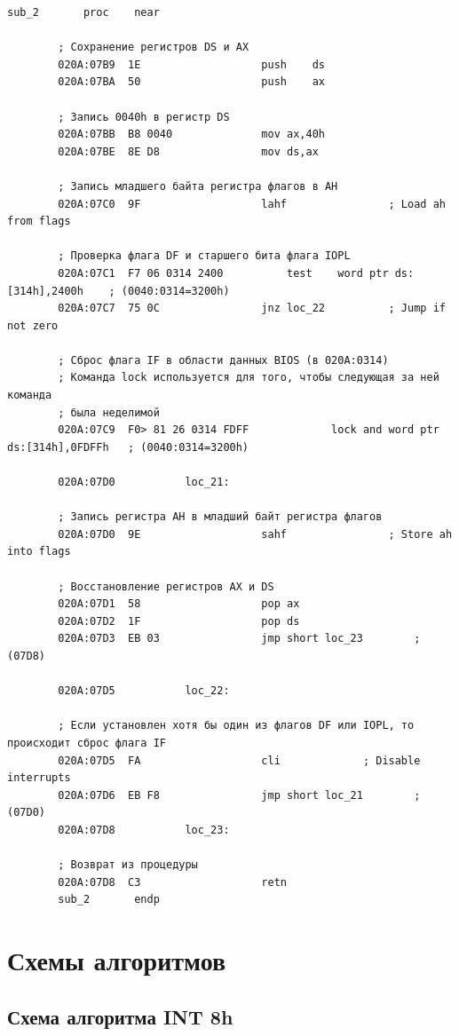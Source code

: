 \documentclass[14pt, a4paper]{article}
\begin{document}
	\begin{lstlisting}[style={asm}]
						sub_2		proc	near
		
		; Сохранение регистров DS и AX
		020A:07B9  1E					push	ds
		020A:07BA  50					push	ax
		
		; Запись 0040h в регистр DS
		020A:07BB  B8 0040				mov	ax,40h
		020A:07BE  8E D8				mov	ds,ax
		
		; Запись младшего байта регистра флагов в AH
		020A:07C0  9F					lahf				; Load ah from flags
		
		; Проверка флага DF и старшего бита флага IOPL
		020A:07C1  F7 06 0314 2400			test	word ptr ds:[314h],2400h	; (0040:0314=3200h)
		020A:07C7  75 0C				jnz	loc_22			; Jump if not zero
		
		; Сброс флага IF в области данных BIOS (в 020A:0314)
		; Команда lock используется для того, чтобы следующая за ней команда
		; была неделимой
		020A:07C9  F0> 81 26 0314 FDFF	           lock	and	word ptr ds:[314h],0FDFFh	; (0040:0314=3200h)
		
		020A:07D0			loc_21:
		
		; Запись регистра AH в младший байт регистра флагов
		020A:07D0  9E					sahf				; Store ah into flags
		
		; Восстановление регистров AX и DS
		020A:07D1  58					pop	ax
		020A:07D2  1F					pop	ds
		020A:07D3  EB 03				jmp	short loc_23		; (07D8)
		
		020A:07D5			loc_22:
		
		; Если установлен хотя бы один из флагов DF или IOPL, то происходит сброс флага IF
		020A:07D5  FA					cli				; Disable interrupts
		020A:07D6  EB F8				jmp	short loc_21		; (07D0)
		020A:07D8			loc_23:
		
		; Возврат из процедуры
		020A:07D8  C3					retn
		sub_2		endp
	\end{lstlisting}
	
	\pagebreak
	
	\section{Схемы алгоритмов}
	
	\subsection{Схема алгоритма INT 8h}
	
\end{document}
